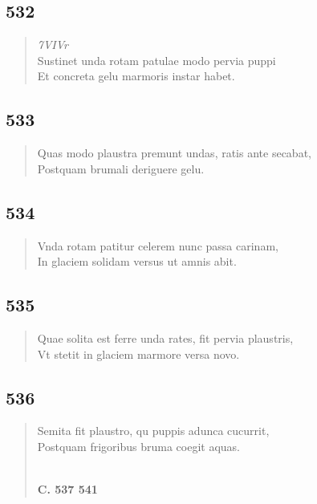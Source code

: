 \documentclass[11pt, a4paper]{report}
\begin{document}
            \subsection*{532}
      \begin{verse}
      \textit{7VIVr} \\ Sustinet unda rotam patulae modo pervia puppi \\ Et concreta gelu marmoris instar habet. \\ 
      \end{verse}
  
            \subsection*{533}
      \begin{verse}
      Quas modo plaustra premunt undas, ratis ante secabat, \\ Postquam brumali deriguere gelu. \\ 
      \end{verse}
  
            \subsection*{534}
      \begin{verse}
      Vnda rotam patitur celerem nunc passa carinam, \\ In glaciem solidam versus ut amnis abit. \\ 
      \end{verse}
  
            \subsection*{535}
      \begin{verse}
      Quae solita est ferre unda rates, fit pervia plaustris, \\ Vt stetit in glaciem marmore versa novo. \\ 
      \end{verse}
  
            \subsection*{536}
      \begin{verse}
      Semita fit plaustro, qu puppis adunca cucurrit, \\ Postquam frigoribus bruma coegit aquas. \\ 
        ﻿\pagebreak 
    \begin{center} \textbf{C. 537 541} \end{center} \marginpar{[68]} 
      \end{verse}
  
\end{document}
